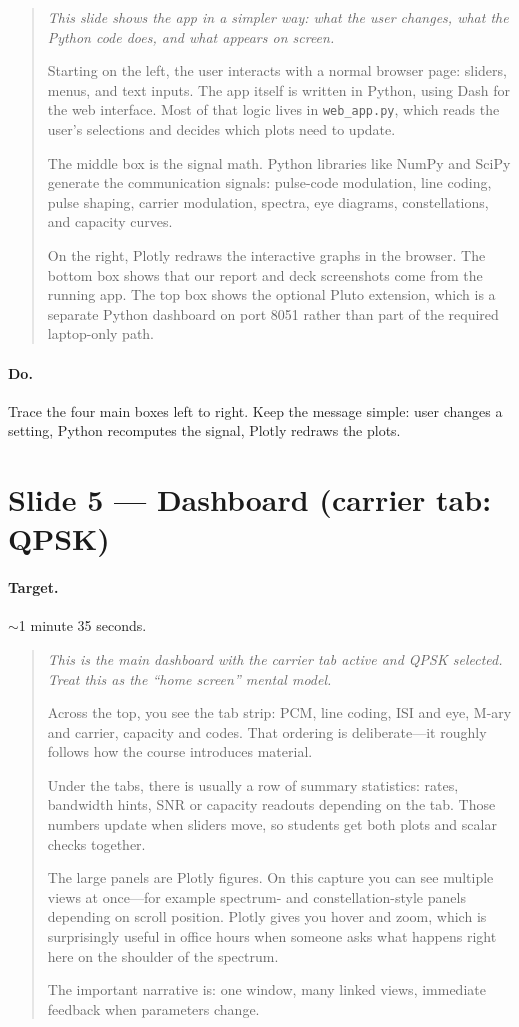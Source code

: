 \documentclass[11pt,a4paper]{article}
\newcommand{\speak}[1]{%
  \begin{quote}\itshape #1\end{quote}%
}
\newcommand{\doitem}[1]{\paragraph{Do.} #1\par\vspace{0.6em}}
\begin{document}
\speak{%
This slide shows the app in a simpler way: what the user changes, what the Python code does, and what appears on screen.

Starting on the left, the user interacts with a normal browser page: sliders, menus, and text inputs. The app itself is written in Python, using Dash for the web interface. Most of that logic lives in \texttt{web\_app.py}, which reads the user's selections and decides which plots need to update.

The middle box is the signal math. Python libraries like NumPy and SciPy generate the communication signals: pulse-code modulation, line coding, pulse shaping, carrier modulation, spectra, eye diagrams, constellations, and capacity curves.

On the right, Plotly redraws the interactive graphs in the browser. The bottom box shows that our report and deck screenshots come from the running app. The top box shows the optional Pluto extension, which is a separate Python dashboard on port 8051 rather than part of the required laptop-only path.%
}

\doitem{Trace the four main boxes left to right. Keep the message simple: user changes a setting, Python recomputes the signal, Plotly redraws the plots.}

\section{Slide 5 --- Dashboard (carrier tab: QPSK)}

\paragraph{Target.} $\sim$1 minute 35 seconds.

\speak{%
This is the main dashboard with the carrier tab active and QPSK selected. Treat this as the ``home screen'' mental model.

Across the top, you see the tab strip: PCM, line coding, ISI and eye, M-ary and carrier, capacity and codes. That ordering is deliberate---it roughly follows how the course introduces material.

Under the tabs, there is usually a row of summary statistics: rates, bandwidth hints, SNR or capacity readouts depending on the tab. Those numbers update when sliders move, so students get both plots and scalar checks together.

The large panels are Plotly figures. On this capture you can see multiple views at once---for example spectrum- and constellation-style panels depending on scroll position. Plotly gives you hover and zoom, which is surprisingly useful in office hours when someone asks what happens right here on the shoulder of the spectrum.

The important narrative is: one window, many linked views, immediate feedback when parameters change.%
}
\end{document}
